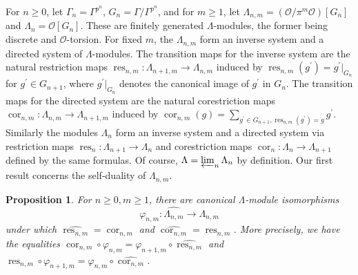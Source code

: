 \documentclass[12 pt]{amsart}
\theoremstyle{plain}
\newtheorem{prop}[thm]{Proposition}
\theoremstyle{definition}
\numberwithin{equation}{section}
\numberwithin{table}{section}
\begin{document}
\indent For $n\geq 0$, let $\Gamma_n=\Gamma^{p^n}$, $G_n=\Gamma/\Gamma^{p^n}$, and for $m\geq 1$, let $\Lambda_{n,m}=(\mathscr{O}/\pi^m\mathscr{O})[G_n]$ and $\Lambda_n=\mathscr{O}[G_n]$. These are finitely generated $\Lambda$-modules, the former being discrete and $\mathscr{O}$-torsion. For fixed $m$, the $\Lambda_{n,m}$ form an inverse system and a directed system of $\Lambda$-modules. The transition maps for the inverse system are the natural restriction maps $\operatorname{res}_{n,m}:\Lambda_{n+1,m}\rightarrow\Lambda_{n,m}$ induced by $\operatorname{res}_{n,m}(g^\prime)=g^\prime\vert_{G_n}$ for $g^\prime\in G_{n+1}$, where $g^\prime\vert_{G_n}$ denotes the canonical image of $g^\prime$ in $G_n$. The transition maps for the directed system are the natural corestriction maps $\operatorname{cor}_{n,m}:\Lambda_{n,m}\rightarrow\Lambda_{n+1,m}$ induced by $\operatorname{cor}_{n,m}(g)=\sum_{g^\prime\in G_{n+1},\operatorname{res}_{n,m}(g^\prime)=g}g^\prime$. Similarly the modules $\Lambda_n$ form an inverse system and a directed system via restriction maps $\operatorname{res}_n:\Lambda_{n+1}\rightarrow\Lambda_n$ and corestriction maps $\operatorname{cor}_n:\Lambda_n\rightarrow\Lambda_{n+1}$ defined by the same formulas. Of course,  $\Lambda=\varprojlim_n\Lambda_n$ by definition. Our first result concerns the self-duality of $\Lambda_{n,m}$. 
\begin{prop}
\label{self-dual}
For $n\geq 0,m\geq 1$, there are canonical $\Lambda$-module isomorphisms 
\begin{equation*}
\varphi_{n,m}:\widehat{\Lambda_{n,m}}\rightarrow\Lambda_{n,m}
\end{equation*}
under which $\widehat{\operatorname{res}_{n,m}}=\operatorname{cor}_{n,m}$ and $\widehat{\operatorname{cor}_{n,m}}=\operatorname{res}_{n,m}$. More precisely, we have the equalities $\operatorname{cor}_{n,m}\circ\varphi_{n,m}=\varphi_{n+1,m}\circ\widehat{\operatorname{res}_{n,m}}$ and $\operatorname{res}_{n,m}\circ\varphi_{n+1,m}=\varphi_{n,m}\circ\widehat{\operatorname{cor}_{n,m}}$.
\end{prop}
\end{document}
